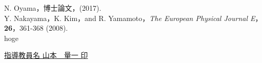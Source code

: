 \documentclass[twocolumns,10pt,a4j]{jarticle}
\begin{document}

  \renewcommand{\refname}{\normalsize 参考文献\vspace{-3truemm}}
  \begin{thebibliography}{9}
    N. Oyama，博士論文，(2017).\\
  \vspace{-7truemm}
    Y. Nakayama，K. Kim，and R. Yamamoto，\textit{The European Physical Journal E}，\textbf{26}，361-368 (2008).\\
  \vspace{-7truemm}
    hoge
  \end{thebibliography}


  \centering
  \underline{指導教員名\hspace{10truemm} 山本　量一 \hspace{20truemm} 印}

\end{document}
